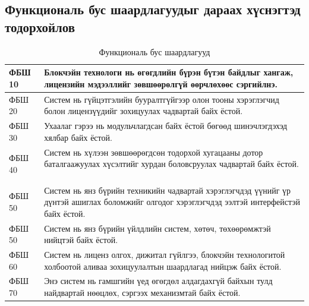 \subsection{Функциональ бус шаардлагуудыг дараах хүснэгтэд тодорхойлов}
\begin{table}[h!]
   \centering
   \begin{tabularx}{\textwidth}{|p{}|X|}
   \hline ФБШ 10 & Блокчэйн технологи нь өгөгдлийн бүрэн бүтэн байдлыг хангаж, лицензийн мэдээллийг зөвшөөрөлгүй өөрчлөхөөс сэргийлнэ.
   \ \\ \hline ФБШ 20 & Систем нь гүйцэтгэлийн бууралтгүйгээр олон тооны хэрэглэгчид болон лицензүүдийг зохицуулах чадвартай байх ёстой.
   \ \\ \hline ФБШ 30 & Ухаалаг гэрээ нь модульчлагдсан байх ёстой бөгөөд шинэчлэгдэхэд хялбар байх ёстой.
   \ \\ \hline ФБШ 40 & Систем нь хүлээн зөвшөөрөгдсөн тодорхой хугацааны дотор баталгаажуулах хүсэлтийг хурдан боловсруулах чадвартай байх ёстой.
   \ \\ \hline ФБШ 50 & Систем нь янз бүрийн техникийн чадвартай хэрэглэгчдэд үүнийг үр дүнтэй ашиглах боломжийг олгодог хэрэглэгчдэд ээлтэй интерфейстэй байх ёстой.
   \ \\ \hline ФБШ 50 & Систем нь янз бүрийн үйлдлийн систем, хөтөч, төхөөрөмжтэй нийцтэй байх ёстой.
   \ \\ \hline ФБШ 60 & Систем нь лиценз олгох, дижитал гүйлгээ, блокчэйн технологитой холбоотой аливаа зохицуулалтын шаардлагад нийцэж байх ёстой.
   \ \\ \hline ФБШ 70 & Энэ систем нь гамшгийн үед өгөгдөл алдагдахгүй байхын тулд найдвартай нөөцлөх, сэргээх механизмтай байх ёстой.
   \\ \hline
\end{tabularx}
\caption{Функциональ бус шаардлагууд}
\end{table}
\clearpage

